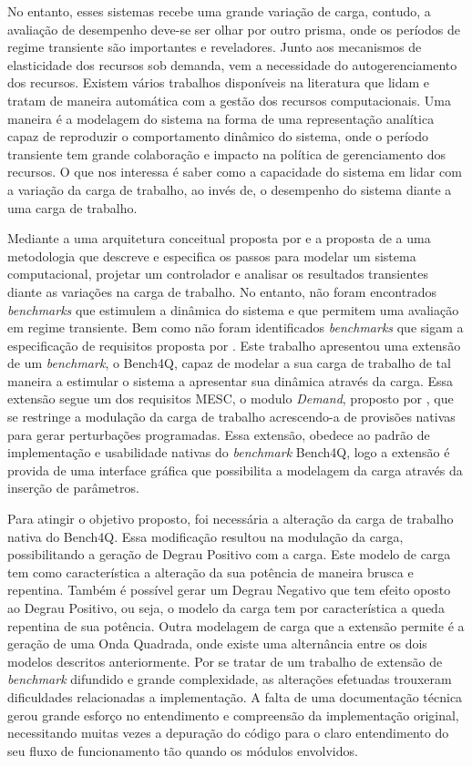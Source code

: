No entanto, esses sistemas recebe uma grande variação de carga, contudo, a avaliação de desempenho deve-se ser olhar por outro prisma, onde os períodos de regime transiente são importantes e reveladores. Junto aos mecanismos de elasticidade dos recursos sob demanda, vem a necessidade do autogerenciamento dos recursos. Existem vários trabalhos disponíveis na literatura que lidam e tratam de maneira automática com a gestão dos recursos computacionais. Uma maneira é a modelagem do sistema na forma de uma representação analítica capaz de reproduzir o comportamento dinâmico do sistema, onde o período transiente tem grande colaboração e impacto na política de gerenciamento dos recursos. O que nos interessa é saber como a capacidade do sistema em lidar com a variação da carga de trabalho, ao invés de, o desempenho do sistema diante a uma carga de trabalho.

Mediante a uma arquitetura conceitual proposta por  e a proposta de   a uma metodologia que descreve e especifica os passos para modelar um sistema computacional, projetar um controlador e analisar os resultados transientes diante as variações na carga de trabalho. No entanto, não foram encontrados \textit{benchmarks} que estimulem a dinâmica do sistema e que permitem uma avaliação em regime transiente. Bem como não foram identificados \textit{benchmarks} que sigam a especificação de requisitos proposta por .
Este trabalho apresentou uma extensão de um \textit{benchmark}, o Bench4Q, capaz de modelar a sua carga de trabalho de tal maneira a estimular o sistema a apresentar sua dinâmica através da carga. Essa extensão segue um dos requisitos MESC, o modulo \textit{Demand}, proposto por , que se restringe a modulação da carga de trabalho acrescendo-a de provisões nativas para gerar perturbações programadas. Essa extensão, obedece ao padrão de implementação e usabilidade nativas do \textit{benchmark} Bench4Q, logo a extensão é provida de uma interface gráfica que possibilita a modelagem da carga através da inserção de parâmetros.

Para atingir o objetivo proposto, foi necessária a alteração da carga de trabalho nativa do Bench4Q. Essa modificação resultou na modulação da carga, possibilitando a geração de Degrau Positivo com a carga. Este modelo de carga tem como característica a alteração da sua potência de maneira brusca e repentina. Também é possível gerar um Degrau Negativo que tem efeito oposto ao Degrau Positivo, ou seja, o modelo da carga tem por característica a queda repentina de sua potência. Outra modelagem de carga que a extensão permite é a geração de uma Onda Quadrada, onde existe uma alternância entre os dois modelos descritos anteriormente. 
Por se tratar de um trabalho de extensão de \textit{benchmark} difundido e grande complexidade, as alterações efetuadas trouxeram dificuldades relacionadas a implementação. A falta de uma documentação técnica gerou grande esforço no entendimento e compreensão da implementação original, necessitando muitas vezes a depuração do código para o claro entendimento do seu fluxo de funcionamento tão quando os módulos envolvidos.

